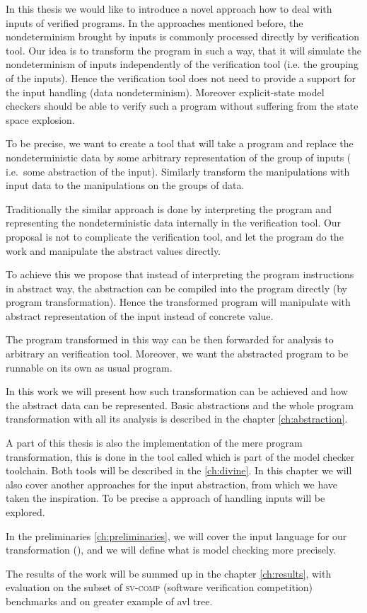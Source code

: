 In this thesis we would like to introduce a novel approach how to deal with
inputs of verified programs. In the approaches mentioned before, the
nondeterminism brought by inputs is commonly processed directly by verification
tool. Our idea is to transform the program in such a way, that it will simulate
the nondeterminism of inputs independently of the verification tool (i.e. the
grouping of the inputs). Hence the verification tool does not need to
provide a support for the input handling (data nondeterminism). Moreover
explicit-state model checkers should be able to verify such a program without
suffering from the state space explosion.

To be precise, we want to create a tool that will take a program and replace the
nondeterministic data by some arbitrary representation of the group of inputs (
i.e.~some abstraction of the input).
Similarly transform the manipulations with input data to the manipulations
on the groups of data.

Traditionally the similar approach is done by interpreting the program and
representing the nondeterministic data internally in the verification tool.
Our proposal is not to complicate the verification tool, and let the program do
the work and manipulate the abstract values directly.

To achieve this we propose that instead of interpreting the program
instructions in abstract way, the abstraction can be compiled into the program
directly (by program transformation). Hence the transformed program will
manipulate with abstract representation of the input instead of concrete value.

The program transformed in this way can be then forwarded for analysis to
arbitrary an verification tool. Moreover, we want the abstracted program to be
runnable on its own as usual program.

In this work we will present how such transformation can be achieved and how
the abstract data can be represented. Basic abstractions and the whole program
transformation with all its analysis is described in the chapter \ref{ch:abstraction}.

A part of this thesis is also the implementation of the mere program
transformation, this is done in the tool called \LART which is part of the
\DIVINE model checker toolchain. Both tools will be described in the
\autoref{ch:divine}. In this chapter we will also cover another approaches for the
input abstraction, from which we have taken the inspiration. To be precise a
\SymDIVINE approach of handling inputs will be explored.

In the preliminaries \autoref{ch:preliminaries}, we will cover the input
language for our transformation (\LLVM), and we will define what is model
checking more precisely.

The results of the work will be summed up in the chapter \autoref{ch:results},
with evaluation on the subset of \textsc{sv-comp} (software verification
competition) benchmarks and on greater example of avl tree.

